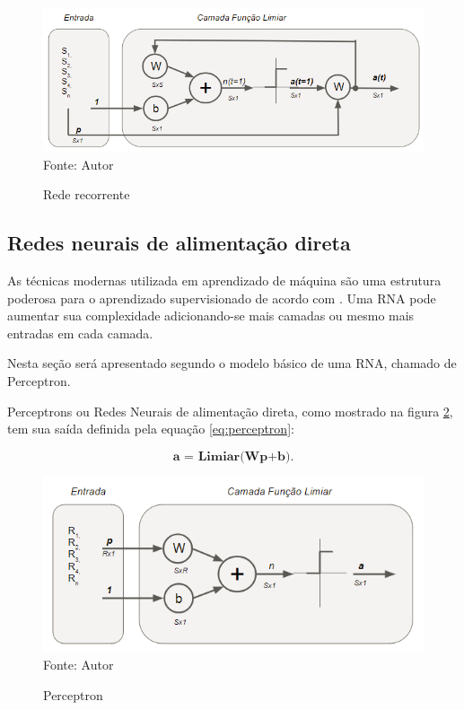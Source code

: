 \documentclass[
	12pt,				%
    oneside,			%
	a4paper,			%
	english,			%
	french,				%
	spanish,			%
	brazil,				%
	]{abntex2}
\begin{document}
\begin{figure}[H]
    \centering
    \caption{Rede recorrente}
    \includegraphics[scale=0.75]{Rede_recorrente1}\\
    Fonte: Autor\hfill
    \label{fig:rederecorrente}
\end{figure}


\subsection{Redes neurais de alimentação direta}

As técnicas modernas utilizada em aprendizado de máquina são uma estrutura poderosa para o aprendizado supervisionado de acordo com . Uma RNA pode aumentar sua complexidade adicionando-se mais camadas ou mesmo mais entradas em cada camada. 

Nesta seção será apresentado segundo  o modelo básico de uma RNA, chamado de Perceptron. 


Perceptrons ou Redes Neurais de alimentação direta, como mostrado na figura \ref{fig:perceptron},  tem sua saída definida pela equação \ref{eq:perceptron}:

 \begin{equation}
    \textbf{a  = Limiar(Wp+b)}.
    \label{eq:perceptron}
  \end{equation} 
  
\begin{figure}[H]
    \centering
    \caption{Perceptron}
    \includegraphics[scale=1]{perceptron1}\\
    Fonte: Autor\hfill
    \label{fig:perceptron}
\end{figure}
\end{document}
